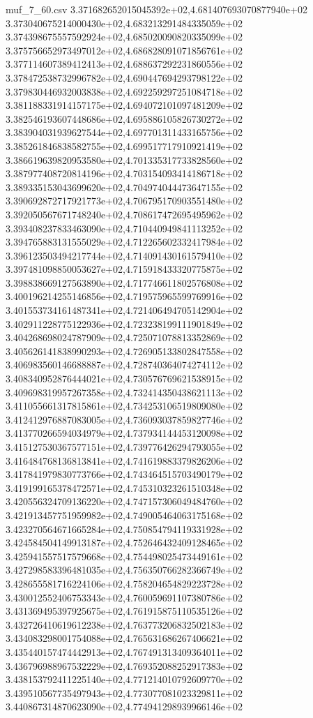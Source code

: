 \begin{filecontents*}{muf_7_60.csv}
3.371682652015045392e+02,4.681407693070877940e+02
3.373040675214000430e+02,4.683213291484335059e+02
3.374398675557592924e+02,4.685020090820335099e+02
3.375756652973497012e+02,4.686828091071856761e+02
3.377114607389412413e+02,4.688637292231860556e+02
3.378472538732996782e+02,4.690447694293798122e+02
3.379830446932003838e+02,4.692259297251084718e+02
3.381188331914157175e+02,4.694072101097481209e+02
3.382546193607448686e+02,4.695886105826730272e+02
3.383904031939627544e+02,4.697701311433165756e+02
3.385261846838582755e+02,4.699517717910921419e+02
3.386619639820953580e+02,4.701335317733828560e+02
3.387977408720814196e+02,4.703154093414186718e+02
3.389335153043699620e+02,4.704974044473647155e+02
3.390692872717921773e+02,4.706795170903551480e+02
3.392050567671748240e+02,4.708617472695495962e+02
3.393408237833463090e+02,4.710440949841113252e+02
3.394765883131555029e+02,4.712265602332417984e+02
3.396123503494217744e+02,4.714091430161579410e+02
3.397481098850053627e+02,4.715918433320775875e+02
3.398838669127563890e+02,4.717746611802576808e+02
3.400196214255146856e+02,4.719575965599769916e+02
3.401553734161487341e+02,4.721406494705142904e+02
3.402911228775122936e+02,4.723238199111901849e+02
3.404268698024787909e+02,4.725071078813352869e+02
3.405626141838990293e+02,4.726905133802847558e+02
3.406983560146688887e+02,4.728740364074274112e+02
3.408340952876444021e+02,4.730576769621538915e+02
3.409698319957267358e+02,4.732414350438621113e+02
3.411055661317815861e+02,4.734253106519809080e+02
3.412412976887083005e+02,4.736093037859827746e+02
3.413770266594034979e+02,4.737934144453120098e+02
3.415127530367577151e+02,4.739776426294793055e+02
3.416484768136813841e+02,4.741619883379826206e+02
3.417841979830773766e+02,4.743464515703490179e+02
3.419199165378472571e+02,4.745310323261510348e+02
3.420556324709136220e+02,4.747157306049484760e+02
3.421913457751959982e+02,4.749005464063175168e+02
3.423270564671665284e+02,4.750854794119331928e+02
3.424584504149913187e+02,4.752646432409128465e+02
3.425941557517579668e+02,4.754498025473449161e+02
3.427298583396481035e+02,4.756350766282366749e+02
3.428655581716224106e+02,4.758204654829223728e+02
3.430012552406753343e+02,4.760059691107380786e+02
3.431369495397925675e+02,4.761915875110535126e+02
3.432726410619612238e+02,4.763773206832502183e+02
3.434083298001754088e+02,4.765631686267406621e+02
3.435440157474442913e+02,4.767491313409364011e+02
3.436796988967532229e+02,4.769352088252917383e+02
3.438153792411225140e+02,4.771214010792609770e+02
3.439510567735497943e+02,4.773077081023329811e+02
3.440867314870623090e+02,4.774941298939966146e+02

\end{filecontents*}

